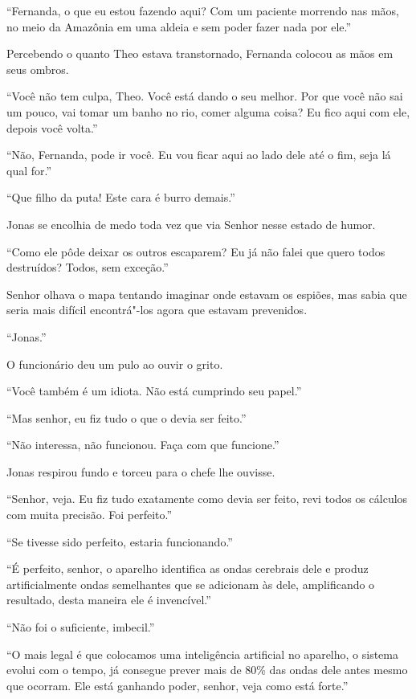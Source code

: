``Fernanda, o que eu estou fazendo aqui? Com um paciente morrendo nas
mãos, no meio da Amazônia em uma aldeia e sem poder fazer nada por
ele.''

Percebendo o quanto Theo estava transtornado, Fernanda colocou as mãos
em seus ombros.

``Você não tem culpa, Theo. Você está dando o seu melhor. Por que você
não sai um pouco, vai tomar um banho no rio, comer alguma coisa? Eu fico
aqui com ele, depois você volta.''

``Não, Fernanda, pode ir você. Eu vou ficar aqui ao lado dele até o fim,
seja lá qual for.''

\asterisc


``Que filho da puta! Este cara é burro demais.''

Jonas se encolhia de medo toda vez que via Senhor  nesse estado de
humor.

``Como ele pôde deixar os outros escaparem? Eu já não falei que quero
todos destruídos? Todos, sem exceção.''

Senhor  olhava o mapa tentando imaginar onde estavam os espiões, mas
sabia que seria mais difícil encontrá"-los agora que estavam prevenidos.

``Jonas.''

O funcionário deu um pulo ao ouvir o grito.

``Você também é um idiota. Não está cumprindo seu papel.''

``Mas senhor, eu fiz tudo o que o devia ser feito.''

``Não interessa, não funcionou. Faça com que funcione.''

Jonas respirou fundo e torceu para o chefe lhe ouvisse.

``Senhor, veja. Eu fiz tudo exatamente como devia ser feito, revi todos
os cálculos com muita precisão. Foi perfeito.''

``Se tivesse sido perfeito, estaria funcionando.''

``É perfeito, senhor, o aparelho identifica as ondas cerebrais dele e
produz artificialmente ondas semelhantes que se adicionam às dele,
amplificando o resultado, desta maneira ele é invencível.''

``Não foi o suficiente, imbecil.''

``O mais legal é que colocamos uma inteligência artificial no aparelho, o
sistema evolui com o tempo, já consegue prever mais de 80\% das ondas
dele antes mesmo que ocorram. Ele está ganhando poder, senhor, veja como
está forte.''

